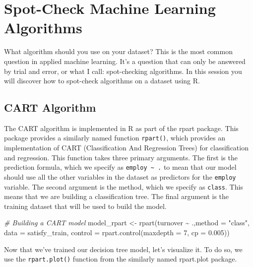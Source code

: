 \documentclass[
]{book}
\newenvironment{Shaded}{\begin{snugshade}}{\end{snugshade}}
\newcommand{\AttributeTok}[1]{\textcolor[rgb]{0.77,0.63,0.00}{#1}}
\newcommand{\CommentTok}[1]{\textcolor[rgb]{0.56,0.35,0.01}{\textit{#1}}}
\newcommand{\DecValTok}[1]{\textcolor[rgb]{0.00,0.00,0.81}{#1}}
\newcommand{\FloatTok}[1]{\textcolor[rgb]{0.00,0.00,0.81}{#1}}
\newcommand{\FunctionTok}[1]{\textcolor[rgb]{0.00,0.00,0.00}{#1}}
\newcommand{\NormalTok}[1]{#1}
\newcommand{\OtherTok}[1]{\textcolor[rgb]{0.56,0.35,0.01}{#1}}
\newcommand{\SpecialCharTok}[1]{\textcolor[rgb]{0.00,0.00,0.00}{#1}}
\newcommand{\StringTok}[1]{\textcolor[rgb]{0.31,0.60,0.02}{#1}}
\begin{document}
\hypertarget{spot-check-machine-learning-algorithms-1}{%
\section{Spot-Check Machine Learning Algorithms}\label{spot-check-machine-learning-algorithms-1}}

What algorithm should you use on your dataset? This is the most common question in applied machine learning. It's a question that can only be answered by trial and error, or what I call: spot-checking algorithms. In this session you will discover how to spot-check algorithms on a dataset using R.

\hypertarget{cart-algorithm-1}{%
\subsection{CART Algorithm}\label{cart-algorithm-1}}

The CART algorithm is implemented in R as part of the rpart package. This package provides a similarly named function \texttt{rpart()}, which provides an implementation of CART (Classification And Regression Trees) for classification and regression.
This function takes three primary arguments. The first is the
prediction formula, which we specify as \texttt{employ\ \textasciitilde{}\ .} to mean that our model should use all the other variables in the dataset as predictors for the \texttt{employ} variable. The second argument is the method, which we specify as \texttt{class}. This means that we are building a classification tree. The final argument is the training dataset that will be used to build the model.

\begin{Shaded}
\begin{Highlighting}[]
\CommentTok{\# Building a CART model}
\NormalTok{model\_rpart }\OtherTok{\textless{}{-}} \FunctionTok{rpart}\NormalTok{(turnover }\SpecialCharTok{\textasciitilde{}}\NormalTok{ .,}\AttributeTok{method =} \StringTok{"class"}\NormalTok{,}
                     \AttributeTok{data =}\NormalTok{ satisfy\_train, }
                     \AttributeTok{control =} \FunctionTok{rpart.control}\NormalTok{(}\AttributeTok{maxdepth =} \DecValTok{7}\NormalTok{,}
                                           \AttributeTok{cp =} \FloatTok{0.005}\NormalTok{))}
\end{Highlighting}
\end{Shaded}

Now that we've trained our decision tree model, let's visualize it. To do so, we use the \texttt{rpart.plot()} function from the similarly named rpart.plot package.
\end{document}
